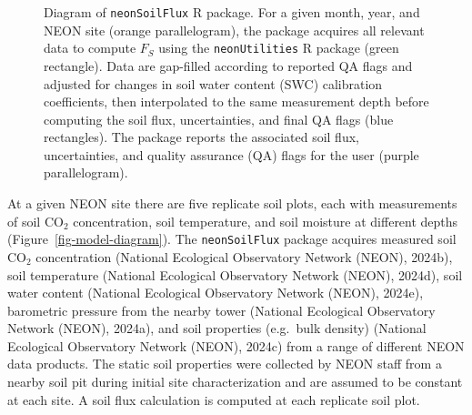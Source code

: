 \documentclass[
  letterpaper,
  DIV=11,
  numbers=noendperiod]{scrartcl}
\begin{document}
\begin{figure}


\caption{\label{fig-package-diagram}Diagram of \texttt{neonSoilFlux} R
package. For a given month, year, and NEON site (orange parallelogram),
the package acquires all relevant data to compute \(F_{S}\) using the
\texttt{neonUtilities} R package (green rectangle). Data are gap-filled
according to reported QA flags and adjusted for changes in soil water
content (SWC) calibration coefficients, then interpolated to the same
measurement depth before computing the soil flux, uncertainties, and
final QA flags (blue rectangles). The package reports the associated
soil flux, uncertainties, and quality assurance (QA) flags for the user
(purple parallelogram).}

\end{figure}%

At a given NEON site there are five replicate soil plots, each with
measurements of soil CO\(_{2}\) concentration, soil temperature, and
soil moisture at different depths (Figure~\ref{fig-model-diagram}). The
\texttt{neonSoilFlux} package acquires measured soil CO\(_{2}\)
concentration (National Ecological Observatory Network (NEON), 2024b),
soil temperature (National Ecological Observatory Network (NEON),
2024d), soil water content (National Ecological Observatory Network
(NEON), 2024e), barometric pressure from the nearby tower (National
Ecological Observatory Network (NEON), 2024a), and soil properties
(e.g.~bulk density) (National Ecological Observatory Network (NEON),
2024c) from a range of different NEON data products. The static soil
properties were collected by NEON staff from a nearby soil pit during
initial site characterization and are assumed to be constant at each
site. A soil flux calculation is computed at each replicate soil plot.
\end{document}

